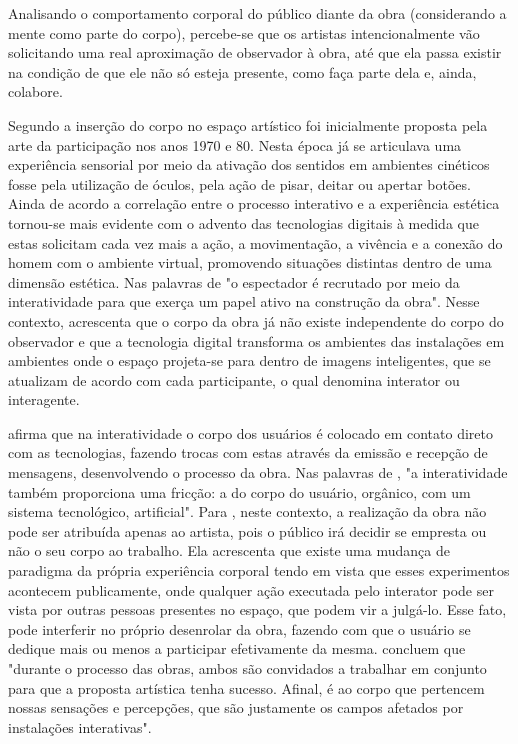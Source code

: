 Analisando o comportamento corporal do público diante da obra (considerando a mente como parte do corpo), percebe-se que os artistas intencionalmente vão solicitando uma real aproximação de observador à obra, até que ela passa existir na condição de que ele não só esteja presente, como faça parte dela e, ainda, colabore. \cite[p. 534]{soares}

Segundo  a inserção do corpo no espaço artístico foi inicialmente proposta pela arte da participação nos anos 1970 e 80. Nesta época já se articulava uma experiência sensorial por meio da ativação dos sentidos em ambientes cinéticos fosse pela utilização de óculos, pela ação de pisar, deitar ou apertar botões. Ainda de acordo  a correlação entre o processo interativo e a experiência estética tornou-se mais evidente com o advento das tecnologias digitais à medida que estas solicitam cada vez mais a ação, a movimentação, a vivência e a conexão do homem com o ambiente virtual, promovendo situações distintas dentro de uma dimensão estética. Nas palavras de  "o espectador é recrutado por meio da interatividade para que exerça um papel ativo na construção da obra". Nesse contexto,  acrescenta que o corpo da obra já não existe independente do corpo do observador e que a tecnologia digital transforma os ambientes das instalações em ambientes onde o espaço projeta-se para dentro de imagens inteligentes, que se atualizam de acordo com cada participante, o qual denomina interator ou interagente.

 afirma que na interatividade o corpo dos usuários é colocado em contato direto com as tecnologias, fazendo trocas com estas através da emissão e recepção de mensagens, desenvolvendo o processo da obra. Nas palavras de , "a interatividade também proporciona uma fricção: a do corpo do usuário, orgânico, com um sistema tecnológico, artificial". Para , neste contexto, a realização da obra não pode ser atribuída apenas ao artista, pois o público irá decidir se empresta ou não o seu corpo ao trabalho. Ela acrescenta que existe uma mudança de paradigma da própria experiência corporal tendo em vista que esses experimentos acontecem publicamente, onde qualquer ação executada pelo interator pode ser vista por outras pessoas presentes no espaço, que podem vir a julgá-lo. Esse fato, pode interferir no próprio desenrolar da obra, fazendo com que o usuário se dedique mais ou menos a participar efetivamente da mesma.  concluem que "durante o processo das obras, ambos são convidados a trabalhar em conjunto para que a proposta artística tenha sucesso. Afinal, é ao corpo que pertencem nossas sensações e percepções, que são justamente os campos afetados por instalações interativas".
